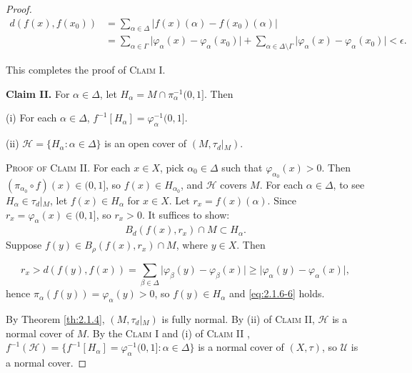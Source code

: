 \documentclass[main.tex]{subfiles}
\begin{document}
\begin{proof}
\begin{equation}
	\begin{aligned}
d(f(x), f(x_0)) &=\sum_{\alpha \in \Delta} \vert{}f(x)(\alpha) - f(x_0)(\alpha)\vert{} \\
&= \sum_{\alpha \in \Gamma} \vert{}\varphi_\alpha(x) - \varphi_\alpha(x_0)\vert{} + 
   \sum_{\alpha \in \Delta\setminus \Gamma} \vert{}\varphi_\alpha(x) - \varphi_\alpha(x_0)\vert{} < \epsilon.
\end{aligned}
\end{equation}

\noindent This completes the proof of \textsc{Claim I}.

\vspace{8pt}
\noindent\textbf{Claim II.} For $\alpha \in \Delta$, let $H_\alpha =M\cap \pi^{-1}_\alpha(0,1]$. Then

(i) For each $\alpha \in \Delta$, $f^{-1}[H_\alpha] = \varphi^{-1}_\alpha(0, 1]$.

(ii) $\mathscr{H} = \{H_\alpha: \alpha \in \Delta\}$ is an open cover of $(M, \tau_d\vert{}_M)$.

\vspace{8pt}
\noindent\textsc{Proof of Claim II.}  For each $x \in X$, pick $\alpha_0 \in \Delta$ such that $\varphi_{\alpha_0}(x) > 0$. Then $(\pi_{\alpha_0} \circ f)(x) \in (0, 1]$, so $f(x) \in H_{\alpha_0}$, and $\mathscr{H}$ covers $M$. 
For each $\alpha \in \Delta$,  to see $H_\alpha \in \tau_d\vert{}_M$, let $f(x) \in H_\alpha$
for $x \in X$. Let $r_x = f(x)(\alpha)$.
Since $r_x = \varphi_\alpha(x) \in (0, 1]$, so $r_x > 0$. It suffices to show:
\begin{gather}
B_d(f(x), r_x) \cap M \subset H_\alpha. \label{eq:2.1.6-6} %
\end{gather}
Suppose $f(y) \in B_\rho(f(x), r_x) \cap M$, where $y \in X$. Then

$$r_x > d(f(y), f(x)) = \sum_{\beta \in \Delta} \vert{}\varphi_\beta(y) - \varphi_\beta(x)\vert{} \ge \vert{}\varphi_\alpha(y) - \varphi_\alpha(x)\vert{},$$
hence $\pi_\alpha(f(y)) = \varphi_\alpha(y) > 0$, so $f(y) \in H_\alpha$ and \eqref{eq:2.1.6-6} holds.

By Theorem \ref{th:2.1.4}, $(M, \tau_d\vert{}_M)$ is fully normal. By (ii) of \textsc{Claim II}, $\mathscr{H}$ is 
a normal cover of $M$. By the \textsc{Claim I} and (i) of \textsc{Claim II} , 
$f^{-1}(\mathscr{H}) = \{f^{-1}[H_\alpha]= \varphi^{-1}_\alpha (0,1]: \alpha \in \Delta\}$ 
is a normal cover of $(X, \tau)$, so $\mathscr{U}$ is a normal cover.
\end{proof} 
\end{document}
